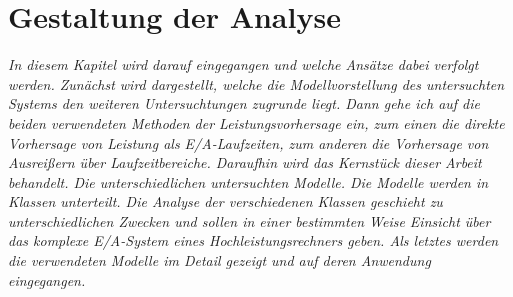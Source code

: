 \documentclass[
	12pt,
	a4paper,
	BCOR10mm,
	DIV14,
	listof=totoc,
	bibliography=totoc,
	headsepline
]{scrreprt}
\begin{document}
\chapter{Gestaltung der Analyse}
\textit{	
In diesem Kapitel wird darauf eingegangen und welche Ansätze dabei verfolgt werden.
Zunächst wird dargestellt, welche die Modellvorstellung des untersuchten Systems 	den weiteren Untersuchtungen zugrunde liegt.
Dann gehe ich auf die beiden verwendeten Methoden der Leistungsvorhersage ein, zum einen die direkte Vorhersage von Leistung als E/A-Laufzeiten, zum anderen die Vorhersage von Ausreißern über Laufzeitbereiche. 
Daraufhin wird das Kernstück dieser Arbeit behandelt. Die unterschiedlichen untersuchten Modelle. Die Modelle werden in Klassen unterteilt. Die Analyse der verschiedenen Klassen geschieht zu unterschiedlichen Zwecken und sollen in einer bestimmten Weise Einsicht über das komplexe E/A-System eines Hochleistungsrechners geben. Als letztes werden die verwendeten Modelle im Detail gezeigt und auf deren Anwendung eingegangen.
}
\bigskip
\end{document}
